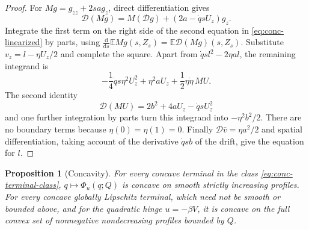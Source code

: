 \documentclass[11pt,a4paper]{article}
\numberwithin{equation}{section}
\newtheorem{proposition}[theorem]{Proposition}
\theoremstyle{definition}
\theoremstyle{remark}
\newcommand{\E}{\mathbb E}
\newcommand{\dd}{\mathrm d}
\begin{document}
\begin{proof}
For $Mg=g_{zz}+2sag_z$, direct differentiation gives
\[
 \mathcal D(Mg)=M(\mathcal Dg)+(2a-\dot q s U_z)g_z.
\]
Integrate the first term on the right side of the second equation in
\eqref{eq:conc-linearized} by parts, using
$\frac{\dd}{\dd s}\E Mg(s,Z_s)=\E\mathcal D(Mg)(s,Z_s)$.
Substitute $v_z=l-\eta U_z/2$ and complete the square.  Apart from
$\dot q s l^2-2\eta a l$, the remaining integrand is
\[
 -\frac14\dot q s\eta^2 U_z^2+\eta^2aU_z
       +\frac12\eta\dot\eta\,MU.
\]
The second identity
\[
 \mathcal D(MU)=2b^2+4aU_z-\dot q s U_z^2
\]
and one further integration by parts turn this integrand into
$-\eta^2b^2/2$.  There are no boundary terms because $\eta(0)=\eta(1)=0$.
Finally $\mathcal D\bar v=\eta a^2/2$ and spatial differentiation, taking
account of the derivative $\dot q s b$ of the drift, give the equation
for $l$.
\end{proof}

\begin{proposition}[Concavity]
\label{prop:conc-concavity}
For every concave terminal in the class
\eqref{eq:conc-terminal-class}, $q\mapsto\Phi_u(q;Q)$ is concave on
smooth strictly increasing profiles.  For every concave globally Lipschitz
terminal, which need not be smooth or bounded above, and for
the quadratic hinge $u=-\beta V$, it is concave on the full convex set
of nonnegative nondecreasing profiles bounded by $Q$.
\end{proposition}
\end{document}
